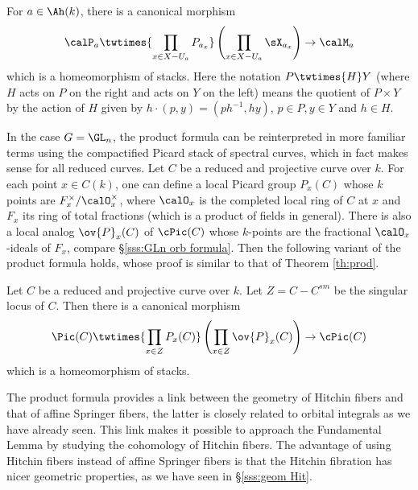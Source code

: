 \begin{theorem}\label{th:prod} For $a\in\Ah(k)$, there is a canonical morphism
\begin{equation*}
\calP_{a}\twtimes{\prod_{x\in X-U_{a}}P_{a_{x}}}\left(\prod_{x\in X-U_{a}}\sX_{a_{x}}\right)\to \calM_{a}
\end{equation*}
which is a homeomorphism of stacks. Here the notation $P\twtimes{H}Y$ (where $H$ acts on $P$ on the right and acts on $Y$ on the left) means the quotient of $P\times Y$ by the action of $H$ given by $h\cdot (p,y)=(ph^{-1}, hy)$, $p\in P, y\in Y$ and $h\in H$.
\end{theorem}

In the case $G=\GL_{n}$, the product formula can be reinterpreted in more familiar terms using the compactified Picard stack of spectral curves, which in fact makes sense for all reduced curves. Let $C$ be a reduced and projective curve over $k$. For each point $x\in C(k)$, one can define a local Picard group $P_{x}(C)$ whose $k$ points are $F^{\times}_{x}/\calO^{\times}_{x}$, where $\calO_{x}$ is the completed local ring of $C$ at $x$ and $F_{x}$ its ring of total fractions (which is a product of fields in general). There is also a local analog $\ov{P}_{x}(C)$ of $\cPic(C)$ whose $k$-points are the fractional $\calO_{x}$-ideals of $F_{x}$, compare \S\ref{sss:GLn orb formula}. Then the following variant of the product formula holds, whose proof is similar to that of Theorem \ref{th:prod}.

\begin{prop}\label{p:Pic prod} Let $C$ be a reduced and projective curve over $k$. Let $Z=C-C^{sm}$ be the singular locus of $C$. Then there is a canonical morphism 
\begin{equation*}
\Pic(C)\twtimes{\prod_{x\in Z}P_{x}(C)}\left(\prod_{x\in Z}\ov{P}_{x}(C)\right)\to\cPic(C)
\end{equation*}
which is a homeomorphism of stacks.
\end{prop}

The product formula provides a link between the geometry of Hitchin fibers and that of affine Springer fibers, the latter is closely related to orbital integrals as we have already seen. This link makes it possible to approach the Fundamental Lemma by studying the cohomology of Hitchin fibers. The advantage of using Hitchin fibers instead of affine Springer fibers is that  the Hitchin fibration has nicer geometric properties, as we have seen in \S\ref{sss:geom Hit}.

